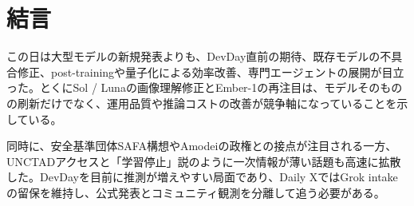 \section*{結言}
この日は大型モデルの新規発表よりも、DevDay直前の期待、既存モデルの不具合修正、post-trainingや量子化による効率改善、専門エージェントの展開が目立った。とくにSol / Lunaの画像理解修正とEmber-1の再注目は、モデルそのものの刷新だけでなく、運用品質や推論コストの改善が競争軸になっていることを示している。

同時に、安全基準団体SAFA構想やAmodeiの政権との接点が注目される一方、UNCTADアクセスと「学習停止」説のように一次情報が薄い話題も高速に拡散した。DevDayを目前に推測が増えやすい局面であり、Daily XではGrok intakeの留保を維持し、公式発表とコミュニティ観測を分離して追う必要がある。
